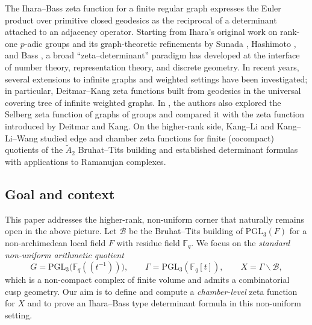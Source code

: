 \documentclass[11pt]{amsart}
\theoremstyle{definition}
\theoremstyle{remark}
\numberwithin{equation}{section}
\begin{document}
The Ihara--Bass zeta function for a finite regular graph expresses the Euler product over primitive closed geodesics as the reciprocal of a determinant attached to an adjacency operator. Starting from Ihara's original work on rank-one $p$-adic groups \cite{I} and its graph-theoretic refinements by Sunada \cite{Su}, Hashimoto \cite{Has}, and Bass \cite{B}, a broad ``zeta--determinant'' paradigm has developed at the interface of number theory, representation theory, and discrete geometry.
In recent years, several extensions to infinite graphs and weighted settings have been investigated; in particular, Deitmar--Kang \cite{DK18} zeta functions built from geodesics in the universal covering tree of infinite weighted graphs. In \cite{HK2}, the authors also explored the Selberg zeta function of graphs of groups and compared it with the zeta function introduced by Deitmar and Kang. 
On the higher-rank side, Kang--Li \cite{KL} and Kang--Li--Wang \cite{KLW10,KLW18} studied edge and chamber zeta functions for finite (cocompact) quotients of the $\widetilde{A}_2$ Bruhat--Tits building and established determinant formulas with applications to Ramanujan complexes.

\subsection*{Goal and context}
This paper addresses the higher-rank, non-uniform corner that naturally remains open in the above picture.
Let $\mathcal{B}$ be the Bruhat--Tits building of $\mathrm{PGL}_3(F)$ for a non-archimedean local field $F$ with residue field $\mathbb{F}_q$.
We focus on the \emph{standard non-uniform arithmetic quotient}
\[
G=\mathrm{PGL}_3\bigl(\mathbb{F}_q(\!(t^{-1})\!)\bigr),
\qquad
\Gamma=\mathrm{PGL}_3(\mathbb{F}_q[t]),
\qquad
X=\Gamma\backslash \mathcal{B},
\]
which is a non-compact complex of finite volume and admits a combinatorial cusp geometry.
Our aim is to define and compute a \emph{chamber-level} zeta function for $X$ and to prove an Ihara--Bass type determinant formula in this non-uniform setting.
\end{document}
